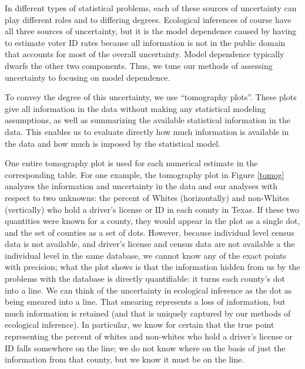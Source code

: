 \documentclass[12pt]{article}
\begin{document}
In different types of statistical problems, each of these sources of
uncertainty can play different roles and to differing degrees.
Ecological inferences of course have all three sources of uncertainty,
but it is the model dependence caused by having to estimate voter ID
rates because all information is not in the public domain that
accounts for most of the overall uncertainty.  Model dependence
typically dwarfs the other two components. Thus, we tune our methods
of assessing uncertainty to focusing on model dependence.

To convey the degree of this uncertainty, we use ``tomography plots''.
These plots give all information in the data without making any
statistical modeling assumptions, as well as summarizing the available
statistical information in the data. This enables us to evaluate
directly how much information is available in the data and how much is
imposed by the statistical model.

One entire tomography plot is used for each numerical estimate in the
corresponding table. For one example, the tomography plot in Figure
\ref{tomog} analyzes the information and uncertainty in the data and
our analyses with respect to two unknowns: the percent of Whites
(horizontally) and non-Whites (vertically) who hold a driver's license
or ID in each county in Texas.  If these two quantities were known for
a county, they would appear in the plot as a single dot, and the set
of counties as a set of dots.  However, because individual level
census data is not available, and driver's license and census data are
not available a the individual level in the same database, we cannot
know any of the exact points with precision; what the plot shows is
that the information hidden from us by the problems with the database
is directly quantifiable: it turns each county's dot into a line.  We
can think of the uncertainty in ecological inference as the dot as
being smeared into a line. That smearing represents a loss of
information, but much information is retained (and that is uniquely
captured by our methods of ecological inference).  In particular, we
know for certain that the true point representing the percent of
whites and non-whites who hold a driver's license or ID falls
somewhere on the line; we do not know where on the basis of just the
information from that county, but we know it must be on the line.
\end{document}
